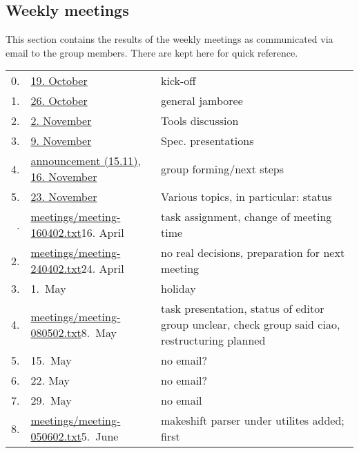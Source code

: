 
\subsection*{Weekly meetings}
\label{sec:meetings}


This section contains the results of the weekly meetings as communicated
via email to the group members. There are kept here for quick reference.




  \begin{table}[htbp]
    \centering
    \begin{tabular}[t]{r@{\quad}l@{\quad\quad}p{9cm}}
    \\\hline
    0.
    &
    \href{meetings/2004-10-19.txt}{19. October}
    &
    kick-off
    \\
    1.
    &
    \href{meetings/2004-10-26.txt}{26. October}
    &
    general jamboree
    \\
    2.
    &
    \href{meetings/2004-11-02.txt}{2. November}
    &
    Tools discussion
    \\
    3.
    &
    \href{meetings/2004-11-09.txt}{9. November}
    &
    Spec. presentations
    \\
    4.
    &
    \href{meetings/2004-11-15-a.txt}{announcement (15.11)},
    \href{meetings/2004-11-16.txt}{16. November}
    &
    group forming/next steps
    \\
    5.
    &
    \href{meetings/2004-11-23.txt}{23. November}
    &
    Various topics, in particular: status
    \\\hline
\iffalse
    1.
    &
    \url{meetings/meeting-160402.txt}{16. April}
    &
    task assignment, change of meeting time
    \\
    2.
    & 
    \url{meetings/meeting-240402.txt}{24. April}
    &
    no real decisions, preparation for next meeting
    \\
    3.
    &
    1.\ May
    &
    holiday
    \\
    4.
    &
    \url{meetings/meeting-080502.txt}{8.\ May}
    & 
    task presentation, status of editor group unclear,
    check group said ciao, restructuring planned
    \\
    5.
    &
    15.\ May
    &
    no email?
    \\
    6.
    &
    22. May
    &
    no email?
    \\
    7.
    &
    29.\ May
    &
    no email
    \\
    8.
    &
    \url{meetings/meeting-050602.txt}{5.\ June}
    &
    makeshift parser under utilites added; first

\end{tabular}
\end{table}
